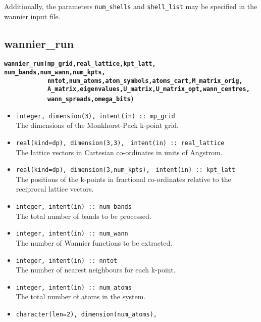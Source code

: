 Additionally, the parameters \verb#num_shells# and \verb#shell_list#
may be specified in the wannier input file.

\subsection{wannier\_run} \label{wannier_run}

{\noindent \bf \verb#wannier_run(mp_grid,real_lattice,kpt_latt,#
\verb#num_bands,num_wann,num_kpts,#\\
\verb#            nntot,num_atoms,atom_symbols,atoms_cart,M_matrix_orig,#\\
\verb#            A_matrix,eigenvalues,U_matrix,U_matrix_opt,wann_centres,#\\
\verb#            wann_spreads,omega_bits#)}

\begin{itemize}
\item \verb#integer, dimension(3), intent(in) :: mp_grid#\\ The
  dimensions of the {Monkhorst-Pack} k-point grid.
\item \verb#real(kind=dp), dimension(3,3),#
      \verb# intent(in) :: real_lattice#\\ The lattice vectors in
      Cartesian co-ordinates in units of Angstrom. 
\item \verb#real(kind=dp), dimension(3,num_kpts),#
      \verb# intent(in) :: kpt_latt#\\ The positions of the k-points in
      fractional co-ordinates relative to the reciprocal lattice
      vectors.
\item \verb#integer, intent(in) :: num_bands#\\ The total number of
      bands to be processed.
\item \verb#integer, intent(in) :: num_wann#\\ The number of Wannier
  functions to be extracted.
\item \verb#integer, intent(in) :: nntot#\\ The number of
  nearest neighbours for each k-point.
\item \verb#integer, intent(in) :: num_atoms#\\ The total number of atoms
  in the system.
\item \verb#character(len=2), dimension(num_atoms),#

\end{itemize}
